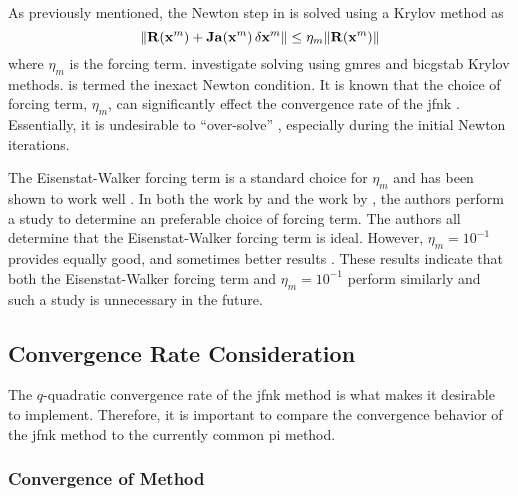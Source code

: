     As previously mentioned, the Newton step in  is solved
    using a Krylov method as
    \begin{equation}
      \label{eq:inexact_newton_condition}
      \| \mathbf{R}(\mathbf{x}^m) + \mathbf{Ja}(\mathbf{x}^m) \, \delta\mathbf{x}^m \| \le 
        \eta_m \| \mathbf{R}(\mathbf{x}^m) \|
    \end{equation}
    where $\eta_m$ is the forcing term. \citeauthor{qe2paper} investigate
    solving  using \gls{gmres} and
    \gls{bicgstab} Krylov methods.  is termed
    the inexact Newton condition. It is known that the choice of forcing term,
    $\eta_m$, can significantly effect the convergence rate of the \gls{jfnk}
    \cite{textbookkelley}. Essentially, it is undesirable to ``over-solve''
    , especially during the initial Newton
    iterations.

    The Eisenstat-Walker forcing term is a standard choice for $\eta_m$ and has
    been shown to work well \cite{qe2paper,gill_azmy}. In both the work by
    \citeauthor{qe2paper} and the work by \citeauthor{gill_azmy}, the authors
    perform a study to determine an preferable choice of forcing term. The
    authors all determine that the Eisenstat-Walker forcing term is ideal.
    However, $\eta_m = 10^{-1}$ provides equally good, and sometimes better
    results \cite{qe2paper,gill_azmy,jfnk_wielandt,ma784notes}. These results 
    indicate that both the Eisenstat-Walker forcing term and $\eta_m = 10^{-1}$
    perform similarly and such a study is unnecessary in the future.

  \subsection{Convergence Rate Consideration}

    The $q$-quadratic convergence rate of the \gls{jfnk} method is what makes it
    desirable to implement. Therefore, it is important to compare the
    convergence behavior of the \gls{jfnk} method to the currently common
    \gls{pi} method.

    \subsubsection{\texorpdfstring{Convergence of 
      Method}{Convergence of Power Iteration Method}}
      \label{sec:dominance_ratio}

